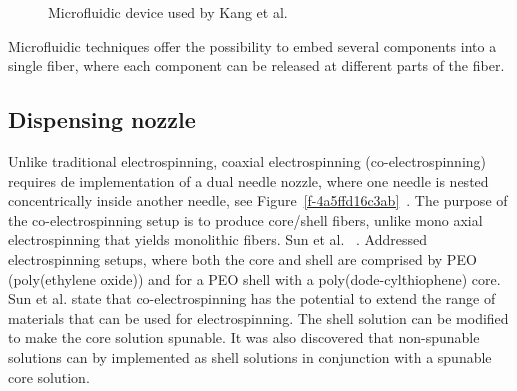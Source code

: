 \documentclass[5p,,preprint,12pt,twocolumn]{elsarticle}
\makeatletter
\def\fixFloatSize#1{}%
\makeatother
\begin{document}
\bgroup
\fixFloatSize{images/efb1d6af-4f1a-4c34-9726-b0015b59e112-uimg_microfluid_setup.png}
\begin{figure}[!htbp]
\centering \makeatletter{}
\makeatother 
\caption{{Microfluidic device used by Kang et al.\unskip~\protect\cite{527120:13656548}}}
\label{f-c0beae2757bf}
\end{figure}
\egroup
Microfluidic techniques offer the possibility to embed several components into a single fiber, where each component can be released at different parts of the fiber. 



\subsection{Dispensing nozzle}Unlike traditional electrospinning, coaxial electrospinning (co-electrospinning) requires de implementation of a dual needle nozzle, where one needle is nested concentrically inside another needle, see Figure~\ref{f-4a5ffd16c3ab}\unskip~\cite{527120:13914792,527120:13914793}. The purpose of the co-electrospinning setup is to produce core/shell fibers, unlike mono axial electrospinning that yields monolithic fibers. Sun et al. \unskip~\cite{527120:13914312}. Addressed electrospinning setups, where both the core and shell are comprised by PEO (poly(ethylene oxide)) and for a PEO shell with a poly(dode-cylthiophene) core. Sun et al. state that co-electrospinning has the potential to extend the range of materials that can be used for electrospinning. The shell solution can be modified to make the core solution spunable. It was also discovered that non-spunable solutions can by implemented as shell solutions in conjunction with a spunable core solution. \unskip~\cite{527120:13914968}
\end{document}
